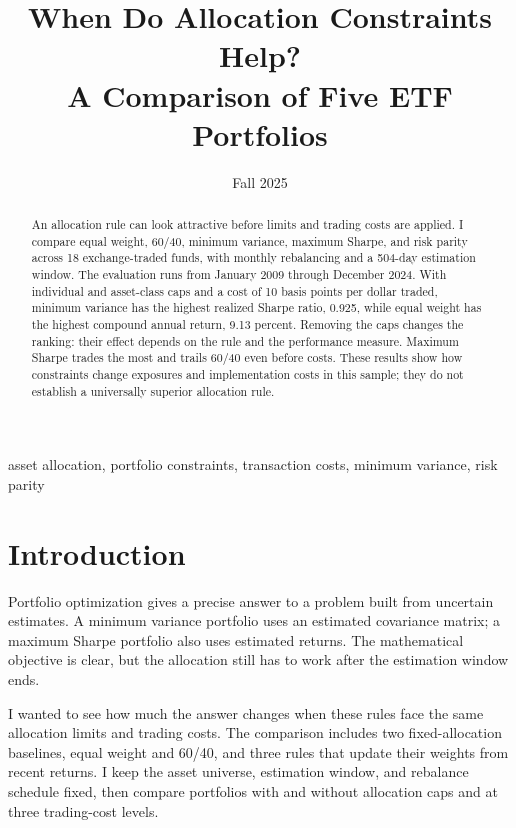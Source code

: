 \documentclass[conference]{IEEEtran}
\date{Fall 2025}
\begin{document}
\raggedbottom

\title{When Do Allocation Constraints Help?\\
A Comparison of Five ETF Portfolios}
\author{
}
\maketitle

\begin{abstract}
An allocation rule can look attractive before limits and trading costs are applied. I compare equal weight, 60/40, minimum variance, maximum Sharpe, and risk parity across 18 exchange-traded funds, with monthly rebalancing and a 504-day estimation window. The evaluation runs from January 2009 through December 2024. With individual and asset-class caps and a cost of 10 basis points per dollar traded, minimum variance has the highest realized Sharpe ratio, 0.925, while equal weight has the highest compound annual return, 9.13 percent. Removing the caps changes the ranking: their effect depends on the rule and the performance measure. Maximum Sharpe trades the most and trails 60/40 even before costs. These results show how constraints change exposures and implementation costs in this sample; they do not establish a universally superior allocation rule.
\end{abstract}

\begin{IEEEkeywords}
asset allocation, portfolio constraints, transaction costs, minimum variance, risk parity
\end{IEEEkeywords}

\section{Introduction}
Portfolio optimization gives a precise answer to a problem built from uncertain estimates. A minimum variance portfolio uses an estimated covariance matrix; a maximum Sharpe portfolio also uses estimated returns. The mathematical objective is clear, but the allocation still has to work after the estimation window ends.

I wanted to see how much the answer changes when these rules face the same allocation limits and trading costs. The comparison includes two fixed-allocation baselines, equal weight and 60/40, and three rules that update their weights from recent returns. I keep the asset universe, estimation window, and rebalance schedule fixed, then compare portfolios with and without allocation caps and at three trading-cost levels.
\end{document}
